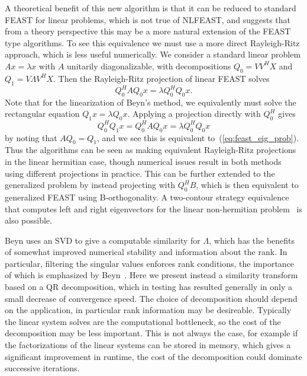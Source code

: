 \documentclass[onefignum,onetabnum]{siamart190516}
\begin{document}
A theoretical benefit of this new algorithm is that it can be reduced to standard FEAST for linear problems, which is not true of NLFEAST, and suggests that from a theory perspective this may be a more natural extension of the FEAST type algorithms.
To see this equivalence we must use a more direct Rayleigh-Ritz approach, which is less useful numerically.
We consider a standard linear problem \( Ax = \lambda x \) with \( A \) unitarily diagonalizable, with decompositions \( Q_0 = VV^H X \) and \( Q_1 = V \Lambda V^H X \).
Then the Rayleigh-Ritz projection of linear FEAST solves
\begin{equation}\label{eq:feast_eig_prob}
	Q_0^H A Q_0 x = \lambda Q_0^H Q_0 x.
\end{equation}
Note that for the linearization of Beyn's method, we equivalently must solve the rectangular equation \( Q_1 x = \lambda Q_0 x \).
Applying a projection directly with \( Q_0^H \) gives
\begin{equation}
	Q_0^H Q_1 x = Q_0^H A Q_0 x = \lambda Q_0^H Q_0 x
\end{equation}
by noting that \( AQ_0 = Q_1 \), and we see this is equivalent to~(\ref{eq:feast_eig_prob}).
Thus the algorithms can be seen as making equivalent Rayleigh-Ritz projections in the linear hermitian case, though numerical issues result in both methods using different projections in practice.
This can be further extended to the generalized problem by instead projecting with \( Q_0^H B \), which is then equivalent to generalized FEAST using B-orthogonality. A two-contour strategy equivalence that computes left and right eigenvectors
for the linear non-hermitian problem~\cite{kestyn2016} is also possible. 


Beyn uses an SVD to give a computable similarity for \( \Lambda \), which has the benefits of somewhat improved numerical stability and information about the rank.
In particular, filtering the singular values enforces rank conditions, the importance of which is emphasized by Beyn~\cite{beyn2012}.
Here we present instead a similarity transform based on a QR decomposition, which in testing has resulted generally in only a small decrease of convergence speed.
The choice of decomposition should depend on the application, in particular rank information may be desireable.
Typically the linear system solves are the computational bottleneck, so the cost of the decomposition may be less important.
This is not always the case, for example if the factorizations of the linear systems can be stored in memory, which gives a significant improvement in runtime, the cost of the decomposition could dominate successive iterations.
\end{document}
